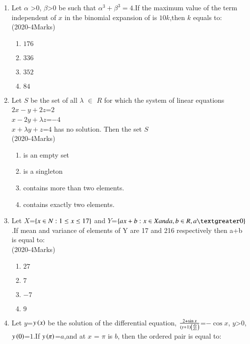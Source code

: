 \documentclass[journal]{IEEEtran}
\begin{document}
\begin{enumerate} [start=16]
    \item Let $\alpha$ \textgreater $0$, $\beta$\textgreater$0$ be such that $\alpha^3+\beta^3=4$.If the maximum value of the term independent of $x$ in the binomial expansion of  is $10k$,then $k$ equals to:\\
     \hfill(2020-4Marks)
    \begin{enumerate}
        \item $176$
        \item $336$
        \item $352$
        \item $84$
    \end{enumerate}
    \item Let $S$ be the set of all $\lambda$ $\in$ $R$ for which the system of linear equations \\
    $2x-y+2z$=$2$\\
    $x-2y+\lambda z$=$-4$\\
    $x+\lambda y+z$=$4$ has no solution. Then the set $S$\\
    \hfill(2020-4Marks)
    \begin{enumerate}
        \item is an empty set
        \item is a singleton
        \item contains more than two elements.
        \item contains exactly two elements.
    \end{enumerate}
    \item Let $X$=$\left\{x\in N:1\leq x\leq 17\right\}$ and $Y$=$\cbrak{ax+b:x \in X and a,b \in R,a \textgreater0}$.If mean and variance of elements of Y are 17 and 216 respectively then a+b is equal to:\\
    \hfill(2020-4Marks)
    \begin{enumerate}
        \item $27$
        \item $7$
        \item $-7$
        \item $9$
    \end{enumerate}
    \item Let $y$=$y\left(x\right)$ be the solution of the differential equation, $\frac{2+\sin{x}}{\left(y+1\right)\left(\frac{dy}{dx}\right)}$=$-\cos{x}$, $y$\textgreater $0$,$y\left(0\right)$=$1$.If $y\left(\pi\right)$=$a$,and at $x$ = $\pi$ is $b$, then the ordered pair  is equal to:\\

\end{enumerate}
\end{document}
